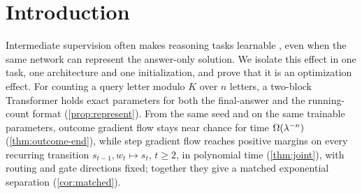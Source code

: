 \begin{abstract}
We prove a learning-time separation between outcome and process supervision in a concrete Transformer. For counting modulo $K$, one
two-block causal softmax-attention/ReLU Transformer holds exact executors for both formats. From the same small initialization and
on the same trainable gate parameters (or any larger set of blocks, for the final count), gradient flow stays near chance for time $\Omega(\mixrate^{-n})$ when trained on the final count, and
reaches positive margins on every recurring transition in time $O(n^{5/2}\log n)$ when trained on the running counts, with the attention routing
and the gate's directions fixed. The mechanism is credit contraction: each letter a feature does not read multiplies its correlation with the final count by
$\mixrate<1$, and near initialization the network is built from features that read few letters, whereas a displayed count leaves an
order-one local signal. Experiments drop the theorems' assumptions one at a time, from learned routing to all parameters under AdamW,
other state-tracking tasks and LoRA-tuned Qwen2.5-0.5B; the separation persists at every rung except one object-tracking size.
\end{abstract}

\section{Introduction}
\label{sec:intro}

Intermediate supervision often makes reasoning tasks learnable \citep{nye2021scratchpads,wei2022cot,lightman2023verify}, even when the
same network can represent the answer-only solution. We isolate this effect in one task, one architecture and one initialization, and
prove that it is an optimization effect. For counting a query letter modulo $K$ over $n$ letters, a two-block Transformer holds exact
parameters for both the final-answer and the running-count format (\cref{prop:represent}). From the same seed and on the same trainable
parameters, outcome gradient flow stays near chance for time $\Omega(\mixrate^{-n})$ (\cref{thm:outcome-end}), while step gradient flow
reaches positive margins on every recurring transition $s_{t-1},w_t\mapsto s_t$, $t\ge2$, in polynomial time (\cref{thm:joint}),
with routing and gate directions fixed; together they give a matched exponential separation
(\cref{cor:matched}).

